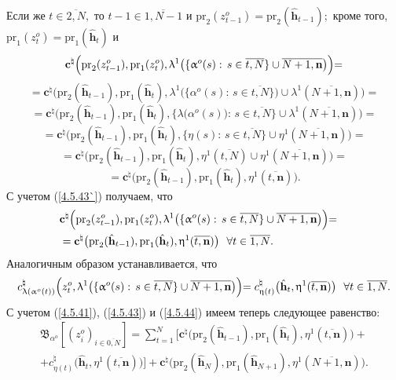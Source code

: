 \documentclass[11pt,twoside,openany]{report}
\newcommand{\ov}{\overline}
\newcommand{\la}{\lambda}
\newcommand{\al}{\alpha}
\newcommand{\fa}{\forall}
\begin{document}
{{ Если же $t\in \ov{2,N},$ то $t-1\in \ov{1,N-1}$ и $\mathrm{pr}_2(z_{t-1}^o) =
\mathrm{pr}_2(\hat{\mathbf{h}}_{t-1});$ кроме того, $\mathrm{pr}_1(z_t^o) =
\mathrm{pr}_1(\hat{\mathbf{h}}_t)$ и
$$\mathbf{c}^\natural\Bigl(\mathrm{pr}_2(z_{t-1}^o),\mathrm{pr}_1(z_t^o),
\la^1\bigl(\{\al^o(s):\,s\in \ov{t,N}\}\cup \ov{N+1,\mathbf{n}}\bigl)\Bigl) =
$$
$$
= \mathbf{c}^\natural\bigl(\mathrm{pr}_2(\hat{\mathbf{h}}_{t-1}),
\mathrm{pr}_1(\hat{\mathbf{h}}_t),
\la^1\bigl(\{\al^o(s):\,s\in\ov{t,N}\}\bigl)\cup \la^1(\ov{N+1,\mathbf{n}})\bigl)=
$$
$$
= \mathbf{c}^\natural\bigl(\mathrm{pr}_2(\hat{\mathbf{h}}_{t-1}),
\mathrm{pr}_1(\hat{\mathbf{h}}_t),
\{\la\bigl(\al^o(s)\bigl):\,s\in\ov{t,N}\}\cup\la^1(\ov{N+1,\mathbf{n}})\bigl)=
$$
$$
=\mathbf{c}^\natural\bigl(\mathrm{pr}_2(\hat{\mathbf{h}}_{t-1}),
\mathrm{pr}_1(\hat{\mathbf{h}}_t),
\{\eta(s):\,s\in\ov{t,N}\}\cup \eta^1(\ov{N+1,\mathbf{n}})\bigl)=
$$
$$= \mathbf{c}^\natural\bigl(\mathrm{pr}_2(\hat{\mathbf{h}}_{t-1}),
\mathrm{pr}_1(\hat{\mathbf{h}}_t),
\eta^1(\ov{t,N})\cup \eta^1(\ov{N+1,\mathbf{n}})\bigl)=
$$
$$
=\mathbf{c}^\natural\bigl(\mathrm{pr}_2(\hat{\mathbf{h}}_{t-1}),
\mathrm{pr}_1(\hat{\mathbf{h}}_t),
\eta^1(\ov{t,\mathbf{n}})\bigl).
$$
С учетом (\ref{4.5.43`}) получаем, что
\begin{eqnarray}
&\mathbf{c}^\natural\Bigl(\mathrm{pr}_2(z_{t-1}^o),\mathrm{pr}_1(z_t^o),
\la^1\bigl(\{\al^o(s):\,s\in \ov{t,N}\}
\cup \ov{N+1,\mathbf{n}}\bigl)\Bigl)=
&\nonumber\\
&= \mathbf{c}^\natural\bigl(\mathrm{pr}_2(\hat{\mathbf{h}}_{t-1}),
\mathrm{pr}_1(\hat{\mathbf{h}}_t),
\eta^1(\ov{t,\mathbf{n}})\bigl)\ \ \fa t\in \ov{1,N}.
&\label{4.5.44}
\end{eqnarray}
Аналогичным образом устанавливается, что
$$c_{\la(\al^o(t))}^\natural\Bigl(z_t^o,\la^1\bigl(\{\al^o(s):\,s\in
\ov{t,N}\} \cup \ov{N+1,\mathbf{n}}\bigl)\Bigl) =
c_{\eta(t)}^\natural\bigl(\hat{\mathbf{h}}_t,\eta^1(\ov{t,\mathbf{n}})\bigl) \ \
\fa t\in\ov{1,N}.
$$
С учетом (\ref{4.5.41}), (\ref{4.5.43}) и (\ref{4.5.44}) имеем теперь следующее равенство:
\begin{eqnarray}
&\mathfrak{B}_{\al^o}[(z_i^o)_{i\in\ov{0,N}}] =
\sum\limits_{t=1}^N\bigl[\mathbf{c}^\natural\bigl(\mathrm{pr}_2(\hat{\mathbf{h}}_{t-1}),
\mathrm{pr}_1(\hat{\mathbf{h}}_t),\eta^1(\ov{t,\mathbf{n}})\bigl) +
&\nonumber\\
&+c_{\eta(t)}^\natural\bigl(\hat{\mathbf{h}}_t,\eta^1(\ov{t,\mathbf{n}})\bigl)
\bigl] + \mathbf{c}^\natural\bigl(\mathrm{pr}_2(\hat{\mathbf{h}}_N),
\mathrm{pr}_1(\hat{\mathbf{h}}_{N+1}),
\eta^1(\ov{N+1,\mathbf{n}})\bigl).

\end{eqnarray}}}
\end{document}
